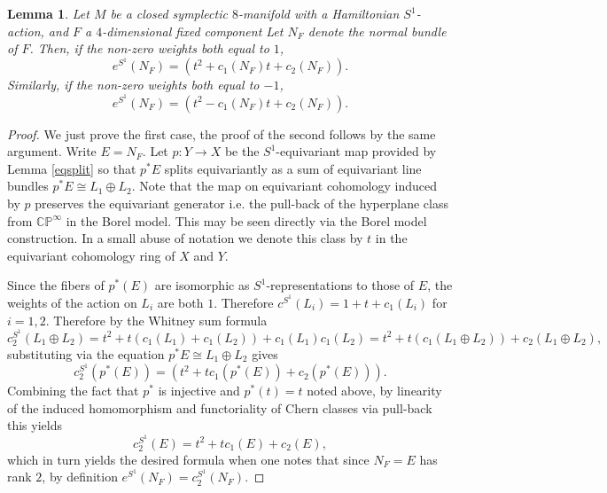 \documentclass[12pt]{article}
\newtheorem{lemma}[theorem]{Lemma}
\begin{document}
\begin{lemma} \label{abbvfourformula}
Let $M$ be a closed symplectic $8$-manifold with a Hamiltonian $S^1$-action, and $F$ a $4$-dimensional fixed component Let $N_F$ denote the normal bundle of $F$. Then, if the non-zero weights both equal to $1$, $$e^{S^1}(N_{F}) = (t^2 + c_{1}(N_{F})t + c_{2}(N_{F}) ). $$ Similarly, if the non-zero weights both equal to $-1$, $$e^{S^1}(N_{F}) = (t^2 - c_{1}(N_{F})t + c_{2}(N_{F}) ). $$
\end{lemma}
\begin{proof}

We just prove the first case, the proof of the second follows by the same argument. Write $E=N_{F}$. Let $p: Y \rightarrow X$ be the $S^1$-equivariant map provided by Lemma \ref{eqsplit} so that $p^{*}E$ splits equivariantly as a sum of equivariant line bundles $p^{*}E \cong L_1 \oplus L_2$. Note that the map on equivariant cohomology induced by $p$ preserves the equivariant generator i.e. the pull-back of the hyperplane class from $\mathbb{CP}^{\infty}$ in the Borel model. This may be seen directly via the Borel model construction. In a small abuse of notation we denote this class by $t$ in the equivariant cohomology ring of $X$ and $Y$.  

 Since the fibers of $p^*(E)$ are isomorphic as $S^1$-representations to those of $E$, the weights of the action on $L_i$ are both $1$. Therefore $c^{S^1}(L_i) = 1 + t + c_1(L_{i})$ for $i=1,2$.  Therefore by the Whitney sum formula $$c_{2}^{S^1}(L_1 \oplus L_2) = t^2 + t(c_1(L_{1})+ c_1(L_{2})) + c_1(L_{1})c_1(L_{2}) =  t^2 + t(c_1(L_{1} \oplus L_{2})) + c_2(L_{1} \oplus L_{2}),$$ substituting via the equation $p^*E \cong L_1 \oplus L_2$ gives $$ c_{2}^{S^1}(p^*(E)) = ( t^2 + tc_1(p^*(E)) + c_2(p^*(E))).$$ Combining the fact that $p^*$ is injective and $p^*(t)=t$ noted above, by linearity of the induced homomorphism and functoriality of Chern classes via pull-back this yields $$ c_{2}^{S^1}(E) =  t^2 + tc_1(E) + c_2(E),$$ which in turn yields the desired formula when one notes that since $N_{F}=E$ has rank $2$, by definition $ e^{S^1}(N_{F}) = c_{2}^{S^1}(N_{F})$. \end{proof}
\end{document}
